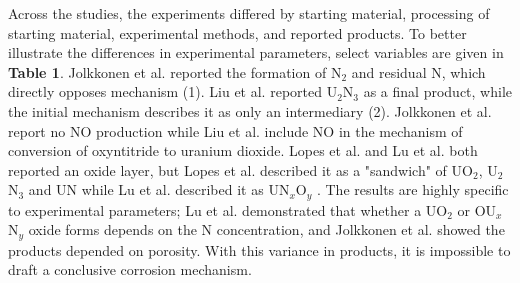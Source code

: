 \documentclass[11pt]{article}
\begin{document}
\begin{multicols}{2}
\par Across the studies, the experiments differed by starting material, processing of starting material, experimental methods, and reported products. To better illustrate the differences in experimental parameters, select variables are given in \textbf{Table 1}. Jolkkonen et al. reported the formation of N$_{2}$ and residual N, which directly opposes mechanism (1). Liu et al. \cite{Liu2013} reported U$_{2}$N$_{3}$ as a final product, while the initial mechanism describes it as only an intermediary (2). Jolkkonen et al. report no NO production while Liu et al. include NO in the mechanism of conversion of oxyntitride to uranium dioxide. Lopes et al. and Lu et al. both reported an oxide layer, but Lopes et al. described it as a "sandwich" of UO$_{2}$, U$_{2}$N$_{3}$ and UN while Lu et al. described it as UN$_{x}$O$_{y}$ .
 The results are highly specific to experimental parameters; Lu et al. demonstrated that whether a UO$_{2}$ or  OU$_{x}$N$_{y}$ oxide forms depends on the N concentration, and Jolkkonen et al. showed the products depended on porosity. With this variance in products, it is impossible to draft a conclusive corrosion mechanism.


\end{multicols}
\end{document}
